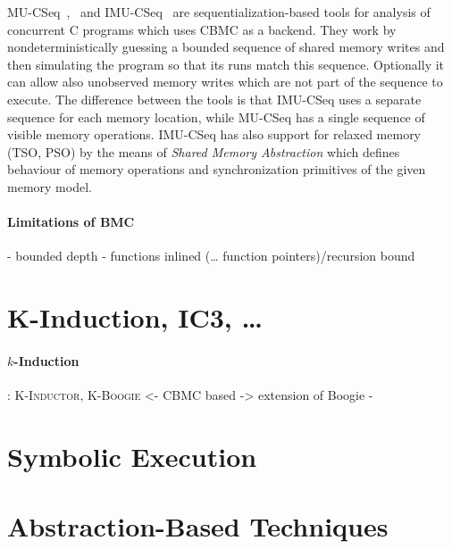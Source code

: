 
MU-CSeq~\cite{Tomasco2015},~\cite{Tomasco2016} and IMU-CSeq~\cite{Tomasco2017}
are sequentialization-based tools for analysis of concurrent C programs which
uses CBMC as a backend.
They work by nondeterministically guessing a bounded sequence of shared memory
writes and then simulating the program so that its runs match this sequence.
Optionally it can allow also unobserved memory writes which are not part of the
sequence to execute.
The difference between the tools is that IMU-CSeq uses a separate sequence for
each memory location, while MU-CSeq has a single sequence of visible memory
operations.
IMU-CSeq has also support for relaxed memory (TSO, PSO) by the means of
\emph{Shared Memory Abstraction} which defines behaviour of memory operations
and synchronization primitives of the given memory model.


\paragraph{Limitations of BMC}

- bounded depth
- functions inlined (… function pointers)/recursion bound

\section{K-Induction, IC3, …}

\paragraph{$k$-Induction}


\cite{Donaldson2011}: \textsc{K-Inductor}, \textsc{K-Boogie}
<- CBMC based
-> extension of Boogie
- 


\section{Symbolic Execution}

\section{Abstraction-Based Techniques}


